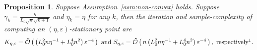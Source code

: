 \documentclass[11pt,reqno]{amsart}
\newcommand{\1}{{\bf 1}}
\newcommand{\2}{{\bf 2}}
\newcommand{\mr}[1]{{\color{blue}#1}}
\newcommand{\us}[1]{\textcolor{red}{#1}}
\newcommand{\bd}{\mathbf}
\newcommand{\cO}{\mathcal O}
\newcommand{\al}{\alpha}
\numberwithin{equation}{section}
\newtheorem{proposition}{Proposition}[section]
\theoremstyle{remark}
\begin{document}
{		\begin{proposition}
			Suppose Assumption~\ref{asm:non-convex} holds. 
			\allowdisplaybreaks
			Suppose $\gamma_k = \frac{\eta}{L_0 \sqrt{n}\sqrt{k+1}}$ and $\eta_k = \eta$ for any $k$, then the {iteration and sample-complexity} of computing an $(\eta,\varepsilon)$-stationary point are
			\begin{equation*}
				K_{\eta,\varepsilon} = {\tilde{\mathcal{O}}}\left(\, \left(L_0^2 n \eta^{-1} + L_0^4 n^2 \right) \varepsilon^{-4} \, \right) \mbox{ and  }  
				{S_{\eta,\varepsilon}} = {\tilde{\mathcal{O}}}\left(\, {n}\left(L_0^2 n \eta^{-1} + L_0^4 n^2 \right) \varepsilon^{-4} \, \right), \mbox{ respectively} \footnotemark.
			\end{equation*}
		\end{proposition}
		
}
\end{document}
